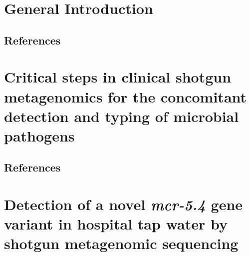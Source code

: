 \documentclass[12pt,a4paper,twoside,openright]{book}
\begin{document}
\begin{sloppy}
\mainmatter

\newpage
\thispagestyle{empty}
\chapter{General Introduction\label{ch:introduction}}
\thispagestyle{empty}
\clearpage \thispagestyle{empty}\mbox{}\clearpage
\newpage
\begin{refsection}

\newpage
\section{References}
\printbibliography[heading=none]
\end{refsection}


\newpage
\thispagestyle{empty}
\chapter{Critical steps in clinical shotgun metagenomics for the concomitant detection and typing of microbial pathogens\label{ch:paper1}}

\thispagestyle{empty}
\clearpage \thispagestyle{empty}\mbox{}\clearpage
\newpage
\begin{refsection}

\newpage
\section{References}
\printbibliography[heading=none]
\end{refsection}

\newpage
\thispagestyle{empty}
\chapter{Detection of a novel \textit{mcr-5.4} gene variant in hospital tap water by shotgun metagenomic sequencing\label{ch:paper2}}

\thispagestyle{empty}
\clearpage \thispagestyle{empty}\mbox{}\clearpage
\newpage
\begin{refsection}

\newpage

\end{refsection}
\end{sloppy}
\end{document}
